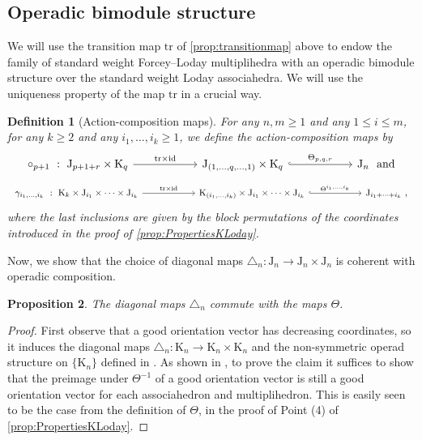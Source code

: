 \documentclass[twoside, 12pt]{amsart}
\newtheorem{definition}{Definition}[section]
\newtheorem{proposition}[definition]{Proposition}
\theoremstyle{remark}
\newcommand{\K}{\mathrm{K}}
\newcommand{\J}{\mathrm{J}}
\newcommand{\tr}{\mathrm{tr}}
\newcommand{\id}{\mathrm{id}}
\begin{document}

\subsection{Operadic bimodule structure} 
We will use the transition map $\tr$ of \cref{prop:transitionmap} above to endow the family of standard weight Forcey--Loday multiplihedra with an operadic bimodule structure over the standard weight Loday associahedra. 
We will use the uniqueness property of the map $\tr$ in a crucial way. 

\begin{definition}[Action-composition maps]
For any $n,m\geq 1$ and any $1\leq i \leq m$, for any $k\geq 2$ and any $i_1,\ldots,i_k \geq 1$, we define the \emph{action-composition maps}  by 
\[
\vcenter{\hbox{
\begin{tikzcd}[column sep=1cm]
\circ_{p+1}\ : \ \J_{p+1+r}\times \K_q
\arrow[rr,  "\tr\times \id"]
& & 
\J_{(1,\ldots,q,\ldots,1)}\times \K_q 
\arrow[rr,hookrightarrow, "\Theta_{p,q,r}"]
&  &
\J_{n}\ \ \text{and}
\end{tikzcd}
}}
\]
\[
\vcenter{\hbox{
\begin{tikzcd}[column sep=1cm]
\gamma_{i_1,\ldots,i_k}\ : \ \K_{k}\times \J_{i_1} \times \cdots \times \J_{i_k}
\arrow[rr,  "\tr\times \id"]
& &
\K_{(i_1,\ldots,i_k)} \times \J_{i_1} \times \cdots \times \J_{i_k} 
\arrow[rr,hookrightarrow, "\Theta^{i_1, \ldots , i_k}"]
& &
\J_{i_1+\cdots + i_k}\ , 
\end{tikzcd}
}}
\]
where the last inclusions are given by the block permutations of the coordinates introduced in the proof of \cref{prop:PropertiesKLoday}. 
\end{definition}

Now, we show that the choice of diagonal maps $\triangle_n : \J_n \to \J_n \times \J_n$ is coherent with operadic composition. 

\begin{proposition} 
\label{prop:thetacommutes}
The diagonal maps $\triangle_n$ commute with the maps $\Theta$.  
\end{proposition}

\begin{proof}
First observe that a good orientation vector has decreasing coordinates, so it induces the diagonal maps $\triangle_n : \K_n \to \K_n \times \K_n$ and the non-symmetric operad structure on $\{\K_n\}$ defined in \cite{MTTV19}. 
As shown in \cite[Proposition 4.14]{LA21}, to prove the claim it suffices to show that the preimage under $\Theta^{-1}$ of a good orientation vector is still a good orientation vector for each associahedron and multiplihedron. 
This is easily seen to be the case from the definition of $\Theta$, in the proof of Point (4) of \cref{prop:PropertiesKLoday}. 
\end{proof}
\end{document}
